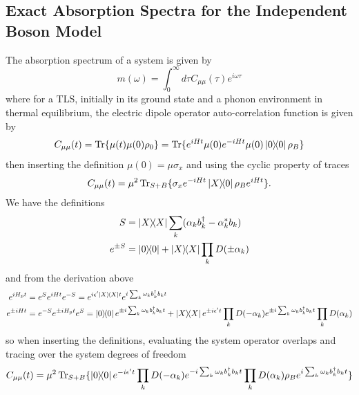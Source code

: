 \documentclass[]{article}
\begin{document}
\begin{itemize}
\begin{itemize}
\section{Exact Absorption Spectra for the Independent Boson Model}
The absorption spectrum of a system is given by
\begin{equation}
m(\omega) = \int_{0}^{\infty}d\tau C_{\mu \mu}(\tau)e^{i\omega\tau}
\end{equation}
where for a TLS, initially in its ground state and a phonon environment in thermal equilibrium, the electric dipole operator auto-correlation function is given by 
\begin{equation}
C_{\mu \mu}(t) = \Tr\{\mu(t)\mu(0)\rho_0\} = \Tr\{e^{iHt}\mu(0) e^{-iHt}\mu(0)\dyad{0}\rho_{B}\}
\end{equation}
then inserting the definition $\mu(0) = \mu\sigma_x$ and using the cyclic property of traces
\begin{equation}
C_{\mu \mu}(t) =  \mu^2\Tr_{S+B}\{\sigma_x e^{-iHt}\dyad{X}{0}\rho_{B}e^{iHt}\}.
\end{equation}
We have the definitions
\begin{equation}
\begin{split}
S &= \dyad{X}\sum_k(\alpha_kb_k^{\dagger}-\alpha_k^{*} b_k) \\
e^{\pm S} &= \dyad{0}+\dyad{X}\prod_kD(\pm \alpha_k)
\end{split}
\end{equation}
and from the derivation above 
\begin{equation}
\begin{split}
e^{i H_p t} &= e^{S} e^{i H t} e^{-S} = e^{i \epsilon^{\prime} \dyad{X}t} e^{i\sum_k \omega_k b_k^{\dagger}b_k t} \\
e^{\pm i H t} &= e^{-S} e^{\pm i H_p t} e^{S} = \dyad{0}e^{\pm i\sum_k \omega_k b_k^{\dagger}b_k t} +\dyad{X}e^{\pm i \epsilon^{\prime}t}\prod_k D(- \alpha_k) e^{\pm i\sum_k \omega_k b_k^{\dagger}b_k t} \prod_k D(\alpha_k)
\end{split}
\end{equation}
so when inserting the definitions, evaluating the system operator overlaps and tracing over the system degrees of freedom
\begin{equation}
\begin{split}
C_{\mu \mu}(t) &=  \mu^2\Tr_{S+B}\{ \dyad{0}{0}e^{- i \epsilon^{\prime}t}\prod_k D(- \alpha_k) e^{- i\sum_k \omega_k b_k^{\dagger}b_k t} \prod_k D(\alpha_k)\rho_{B} e^{ i\sum_k \omega_k b_k^{\dagger}b_k t}\} \\

\end{split}
\end{equation}
\end{itemize}
\end{itemize}
\end{document}
